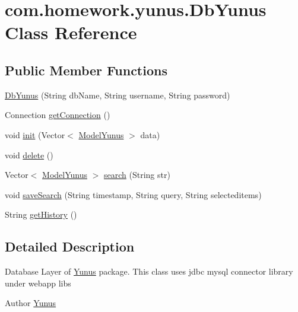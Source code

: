 \hypertarget{classcom_1_1homework_1_1yunus_1_1_db_yunus}{}\section{com.\+homework.\+yunus.\+Db\+Yunus Class Reference}
\label{classcom_1_1homework_1_1yunus_1_1_db_yunus}
\subsection*{Public Member Functions}
\begin{DoxyCompactItemize}
\item 
\hyperlink{classcom_1_1homework_1_1yunus_1_1_db_yunus_a0471eb6b18272009f3bd3728510f4c6c}{Db\+Yunus} (String db\+Name, String username, String password)
\item 
Connection \hyperlink{classcom_1_1homework_1_1yunus_1_1_db_yunus_a5cdbf15a8027a2d8ff2201d451e12297}{get\+Connection} ()
\item 
void \hyperlink{classcom_1_1homework_1_1yunus_1_1_db_yunus_af545ad91b2ddf224346cb4914bd36583}{init} (Vector$<$ \hyperlink{classcom_1_1homework_1_1yunus_1_1_model_yunus}{Model\+Yunus} $>$ data)
\item 
void \hyperlink{classcom_1_1homework_1_1yunus_1_1_db_yunus_ac0f46ce9c1b762a530e4f19fae4e0f01}{delete} ()
\item 
Vector$<$ \hyperlink{classcom_1_1homework_1_1yunus_1_1_model_yunus}{Model\+Yunus} $>$ \hyperlink{classcom_1_1homework_1_1yunus_1_1_db_yunus_a3010b549e3a1b7b21d63c65f66d5a7eb}{search} (String str)
\item 
void \hyperlink{classcom_1_1homework_1_1yunus_1_1_db_yunus_a36c0889028f98b4c5d823f17c3efbd71}{save\+Search} (String timestamp, String query, String selecteditems)
\item 
String \hyperlink{classcom_1_1homework_1_1yunus_1_1_db_yunus_a35f377c750efbe182daa17daaf9af672}{get\+History} ()
\end{DoxyCompactItemize}


\subsection{Detailed Description}
Database Layer of \hyperlink{classcom_1_1homework_1_1yunus_1_1_yunus}{Yunus} package. This class uses jdbc mysql connector library under webapp libs \begin{DoxyAuthor}{Author}
\hyperlink{classcom_1_1homework_1_1yunus_1_1_yunus}{Yunus} 
\end{DoxyAuthor}


